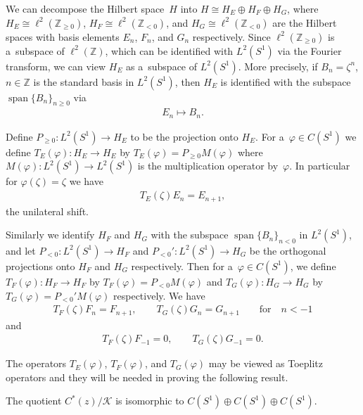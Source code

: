We can decompose the Hilbert space~$H$ into $H \cong H_E \oplus H_F \oplus H_G$, where $H_E\cong\ell^2({\mathbb
Z}_{\ge0})$, $H_F\cong\ell^2({\mathbb Z}_{<0})$, and $H_G\cong\ell^2({\mathbb Z}_{<0})$ are the Hilbert spaces with
basis elements $E_n$, $F_n$, and $G_n$ respectively.
Since $\ell^2({\mathbb Z}_{\ge0})$ is a~subspace of $\ell^2({\mathbb Z})$, which can be identif\/ied with $L^2(S^1)$ via
the Fourier transform, we can view $H_E$ as a~subspace of $L^2(S^1)$.
More precisely, if $B_n=\zeta^n$, $n\in{\mathbb Z}$ is the standard basis in $L^2(S^1)$, then $H_E$ is identif\/ied with
the subspace $\operatorname{span}\{B_n\}_{n\geq 0}$ via
\begin{gather*}
E_n\mapsto B_n.
\end{gather*}

Def\/ine $P_{\ge0}: L^2(S^1)\to H_E$ to be the projection onto $H_E$.
For a~$\varphi\in C(S^1)$ we def\/ine $T_E(\varphi):H_E \to H_E$ by $T_E(\varphi)=P_{\ge0}M(\varphi)$ where
$M(\varphi):L^2(S^1)\to L^2(S^1)$ is the multiplication operator by~$\varphi$.
In particular for $\varphi(\zeta)=\zeta$ we have{\samepage
\begin{gather}
\label{teone}
T_E(\zeta)E_n=E_{n+1},
\end{gather}
the unilateral shift.}

Similarly we identify $H_F$ and $H_G$ with the subspace $\operatorname{span}\{B_n\}_{n< 0}$ in $L^2(S^1)$, and let $P_{<0}:L^2(S^1)\to
H_F$ and $P_{<0}':L^2(S^1)\to H_G$ be the orthogonal projections onto $H_F$ and $H_G$ respectively.
Then for a~$\varphi\in C(S^1)$, we def\/ine $T_F(\varphi):H_F \to H_F$ by $T_F(\varphi)=P_{<0}M(\varphi)$ and
$T_G(\varphi):H_G\to H_G$ by $T_G(\varphi)=P_{<0}'M(\varphi)$ respectively.
We have
\begin{gather}
\label{tfonf}
T_F(\zeta)F_n=F_{n+1},
\qquad
T_G(\zeta)G_n=G_{n+1}
\qquad
\text{for}
\quad
n<-1
\end{gather}
and
\begin{gather}
\label{tgong}
T_F(\zeta)F_{-1}=0,
\qquad
T_G(\zeta)G_{-1}=0.
\end{gather}

The operators $T_E(\varphi)$, $T_F(\varphi)$, and $T_G(\varphi)$ may be viewed as Toeplitz operators and they will be
needed in proving the following result.

\begin{Theorem}
\label{quotient_algebra}
The quotient $C^*(z)/\mathcal{K}$ is isomorphic to $C(S^1)\oplus C(S^1)\oplus C(S^1)$.
\end{Theorem}

